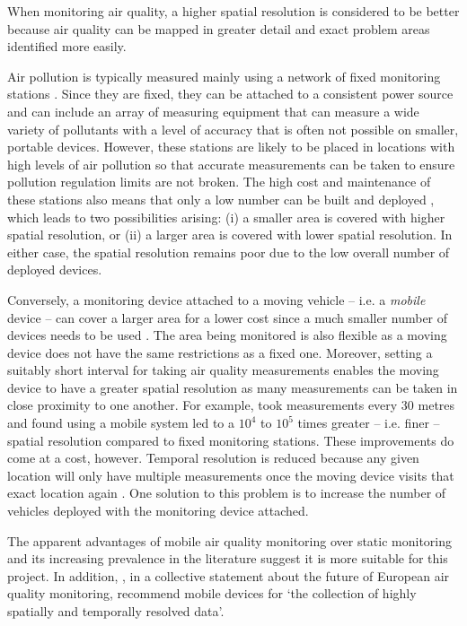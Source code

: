 \documentclass[11pt,twosided,a4paper]{report}
\begin{document}
When monitoring air quality, a higher spatial resolution is considered to be better because air quality can be mapped in greater detail and exact problem areas identified more easily.

Air pollution is typically measured mainly using a network of fixed monitoring stations \citep{Adams2012hamilton20052010}. Since they are fixed, they can be attached to a consistent power source and can include an array of measuring equipment that can measure a wide variety of pollutants with a level of accuracy that is often not possible on smaller, portable devices. However, these stations are likely to be placed in locations with high levels of air pollution \citep{Kanaroglou2005location} so that accurate measurements can be taken to ensure pollution regulation limits are not broken. The high cost and maintenance of these stations also means that only a low number can be built and deployed \citep{Devarakonda2013}, which leads to two possibilities arising: (i) a smaller area is covered with higher spatial resolution, or (ii) a larger area is covered with lower spatial resolution. In either case, the spatial resolution remains poor due to the low overall number of deployed devices.

Conversely, a monitoring device attached to a moving vehicle -- i.e. a \textit{mobile} device -- can cover a larger area for a lower cost since a much smaller number of devices needs to be used \citep{Wallace2009mobilehamilton}. The area being monitored is also flexible as a moving device does not have the same restrictions as a fixed one. Moreover, setting a suitably short interval for taking air quality measurements enables the moving device to have a greater spatial resolution as many measurements can be taken in close proximity to one another. For example, \cite{Apte2017googlestreetview} took measurements every 30 metres and found using a mobile system led to a $10^4$ to $10^5$ times greater -- i.e. finer -- spatial resolution compared to fixed monitoring stations. These improvements do come at a cost, however. Temporal resolution is reduced because any given location will only have multiple measurements once the moving device visits that exact location again \citep{Wong2009envmonitoringtemporal}. One solution to this problem is to increase the number of vehicles deployed with the monitoring device attached.

The apparent advantages of mobile air quality monitoring over static monitoring and its increasing prevalence in the literature suggest it is more suitable for this project. In addition, \cite{Kuhlbusch2014futureEUair}, in a collective statement about the future of European air quality monitoring, recommend mobile devices for `the collection of highly spatially and temporally resolved data'.
\end{document}
